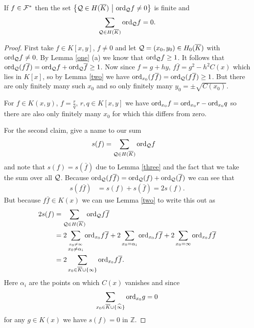 \documentclass[english,11pt,a4paper]{article}
\begin{document}
\begin{lemma}\label{sform}
  If $f \in \mathcal{F}^*$ then the set $\big \{ \mathcal{Q} \in H(\overline K) \ \big | \ \text{ord}_{\mathcal{Q}} f \neq 0 \big \}$ is finite and 
  \begin{align*}
    \sum_{\q \in \ekb} \ordq f = 0.%
  \end{align*}
  \begin{proof}
    First take $f \in K[x,y]$, $f \neq 0$ and let $\mathcal{Q} = (x_0,y_0) \in H_0(\overline K)$ with $\text{ord}_{\mathcal{Q}} f \neq 0$. By Lemma \ref{one} (a) we know that $\text{ord}_{\mathcal{Q}} f \geq 1$. It follows that $\text{ord}_{\mathcal{Q}} (f \overline f) = \text{ord}_{\mathcal{Q}} f + \text{ord}_{\mathcal{Q}} \overline f \geq 1$. Now since $f = g + h y$, $f \bar f = g^2 - h^2 C(x)$ which lies in $K[x]$, so by Lemma \ref{two} we have $\text{ord}_{x_0} (f \overline f) = \text{ord}_{\mathcal{Q}} (f \overline f) \geq 1$. But there are only finitely many such $x_0$ and so only finitely many $y_0 = \pm \sqrt{C(x_0)}$.

    For $f \in K(x,y)$, $f = \frac r q$, $r, q \in K[x,y]$ we have $\text{ord}_{x_0} f = \text{ord}_{x_0} r - \text{ord}_{x_0} q$ so there are also only finitely many $x_0$ for which this differs from zero.

    For the second claim, give a name to our sum
    \begin{align*}
      s(f) &= \sum_{\mathcal{Q} \in H(\overline K)} \text{ord}_{\mathcal{Q}} f
    \end{align*}
    and note that $s(f) = s(\bar f)$ due to Lemma \ref{three} and the fact that we take the sum over all $\mathcal{Q}$. Because $\text{ord}_{\mathcal{Q}} (f \overline f ) = \text{ord}_{\mathcal{Q}} (f) + \text{ord}_{\mathcal{Q}} ( \overline f )$ we can see that
    \begin{align*}
      s(f \bar f) &= s(f) + s(\bar f) = 2 s(f).
    \end{align*}
    But because $f \bar f \in K(x)$ we can use Lemma \ref{two} to write this out as
    \begin{align*}
      2s(f) &= \sum_{\mathcal{Q} \in H(\overline K)} \text{ord}_{\mathcal{Q}} f \overline f\\
      			&=2 \sum_{\stackrel{x_0 \neq \infty}{x_0 \neq \alpha_i}} \text{ord}_{x_0} f \overline f 
      			+ 2 \sum_{x_0 = \alpha_i} \text{ord}_{x_0} f \overline f 
      			+ 2 \sum_{x_0 = \infty} \text{ord}_{x_0} f \overline f\\
      			&=2 \sum_{x_0 \in \overline K \cup \{ \infty \}} \text{ord}_{x_0} f \overline f.
    \end{align*}
    Here $\alpha_i$ are the points on which $C(x)$ vanishes %
    and since
    \begin{align*}
    	\sum_{x_0 \in \overline K \cup \{ \widehat{\infty} \}} \text{ord}_{x_0} g = 0
    \end{align*}
    for any $g \in K(x)$ we have $s(f) = 0$ in $\mathds{Z}$.
  \end{proof}
\end{lemma}
\end{document}

